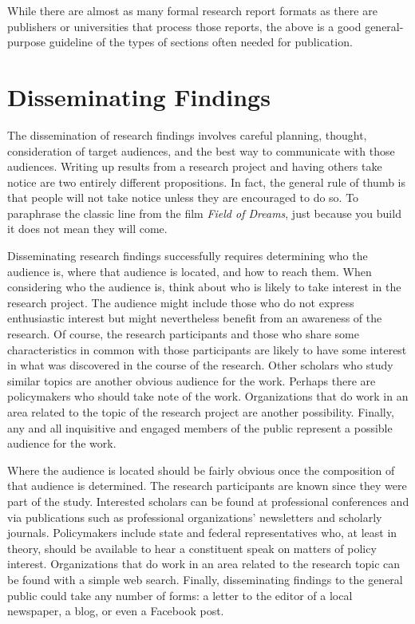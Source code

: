 While there are almost as many formal research report formats as there are publishers or universities that process those reports, the above is a good general-purpose guideline of the types of sections often needed for publication.

\section{Disseminating Findings}

The dissemination of research findings involves careful planning, thought, consideration of target audiences, and the best way to communicate with those audiences. Writing up results from a research project and having others take notice are two entirely different propositions. In fact, the general rule of thumb is that people will not take notice unless they are encouraged to do so. To paraphrase the classic line from the film \textit{Field of Dreams}, just because you build it does not mean they will come.

Disseminating research findings successfully requires determining who the audience is, where that audience is located, and how to reach them. When considering who the audience is, think about who is likely to take interest in the research project. The audience might include those who do not express enthusiastic interest but might nevertheless benefit from an awareness of the research. Of course, the research participants and those who share some characteristics in common with those participants are likely to have some interest in what was discovered in the course of the research. Other scholars who study similar topics are another obvious audience for the work. Perhaps there are policymakers who should take note of the work. Organizations that do work in an area related to the topic of the research project are another possibility. Finally, any and all inquisitive and engaged members of the public represent a possible audience for the work.

Where the audience is located should be fairly obvious once the composition of that audience is determined. The research participants are known since they were part of the study. Interested scholars can be found at professional conferences and via publications such as professional organizations' newsletters and scholarly journals. Policymakers include state and federal representatives who, at least in theory, should be available to hear a constituent speak on matters of policy interest. Organizations that do work in an area related to the research topic can be found with a simple web search. Finally, disseminating findings to the general public could take any number of forms: a letter to the editor of a local newspaper, a blog, or even a Facebook post.

